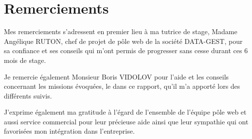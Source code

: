 \chapter{Remerciements}
\setlength{\parskip}{0.5\baselineskip}





Mes remerciements s’adressent en premier lieu à ma tutrice de stage,  Madame Angélique RUTON, chef de projet de pôle web de la société DATA-GEST, pour sa confiance et ses conseils qui m’ont permis de progresser sans cesse durant ces 6 mois de stage.
 
Je remercie également Monsieur Boris VIDOLOV pour l’aide et les conseils concernant les missions évoquées, le dans ce rapport, qu’il m’a apporté lors des différents suivis.
 
J’exprime également ma gratitude à l’égard de l’ensemble de l'équipe pôle web et aussi service commercial pour leur précieuse aide ainsi que leur sympathie qui ont favorisées mon intégration dans l’entreprise.
